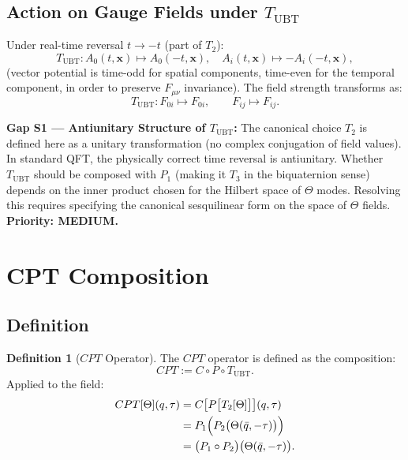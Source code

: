 \documentclass[12pt,a4paper]{article}
\theoremstyle{definition}
\newtheorem{definition}[theorem]{Definition}
\theoremstyle{remark}
\begin{document}
\subsection{Action on Gauge Fields under $T_{\mathrm{UBT}}$}

Under real-time reversal $t \to -t$ (part of $T_2$):
\begin{equation}
  T_{\mathrm{UBT}}: A_0(t,\mathbf{x}) \mapsto A_0(-t,\mathbf{x}),
  \quad
  A_i(t,\mathbf{x}) \mapsto -A_i(-t,\mathbf{x}),
  \label{eq:sym:T_gauge}
\end{equation}
(vector potential is time-odd for spatial components, time-even for the
temporal component, in order to preserve $F_{\mu\nu}$ invariance).
The field strength transforms as:
\begin{equation}
  T_{\mathrm{UBT}}: F_{0i} \mapsto F_{0i},
  \qquad
  F_{ij} \mapsto F_{ij}.
  \label{eq:sym:T_Fmunu}
\end{equation}

\begin{gapbox}
\textbf{Gap S1 --- Antiunitary Structure of $T_{\mathrm{UBT}}$:}
The canonical choice $T_2$ is defined here as a unitary transformation
(no complex conjugation of field values).  In standard QFT, the physically
correct time reversal is antiunitary.  Whether $T_{\mathrm{UBT}}$ should
be composed with $P_1$ (making it $T_3$ in the biquaternion sense) depends on
the inner product chosen for the Hilbert space of $\Theta$ modes.
Resolving this requires specifying the canonical sesquilinear form on the
space of $\Theta$ fields.  \textbf{Priority: MEDIUM.}
\end{gapbox}

\section{CPT Composition}
\label{sec:sym:CPT}

\subsection{Definition}

\begin{definition}[$CPT$ Operator]
\label{def:sym:CPT}
The $CPT$ operator is defined as the composition:
\begin{equation}
  CPT := C \circ P \circ T_{\mathrm{UBT}}.
  \label{eq:sym:CPT}
\end{equation}
Applied to the field:
\begin{align}
  CPT[\Theta](q,\tau)
  &= C\bigl[P\bigl[T_2[\Theta]\bigr]\bigr](q,\tau) \notag \\
  &= P_1\Bigl(P_2\bigl(\Theta(\bar{q}, -\tau)\bigr)\Bigr) \notag \\
  &= \bigl(P_1 \circ P_2\bigr)\bigl(\Theta(\bar{q}, -\tau)\bigr).
  \label{eq:sym:CPT_explicit}
\end{align}
\end{definition}
\end{document}
